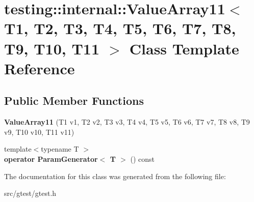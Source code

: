 \hypertarget{classtesting_1_1internal_1_1_value_array11}{}\section{testing\+:\+:internal\+:\+:Value\+Array11$<$ T1, T2, T3, T4, T5, T6, T7, T8, T9, T10, T11 $>$ Class Template Reference}
\label{classtesting_1_1internal_1_1_value_array11}
\subsection*{Public Member Functions}
\begin{DoxyCompactItemize}
\item 
\mbox{\label{classtesting_1_1internal_1_1_value_array11_a2b26f49e7c5856e86f4fae360cd22d47}} 
{\bfseries Value\+Array11} (T1 v1, T2 v2, T3 v3, T4 v4, T5 v5, T6 v6, T7 v7, T8 v8, T9 v9, T10 v10, T11 v11)
\item 
\mbox{\label{classtesting_1_1internal_1_1_value_array11_a3042498fcde8d1c91df474e618416f28}} 
{\footnotesize template$<$typename T $>$ }\\{\bfseries operator Param\+Generator$<$ T $>$} () const
\end{DoxyCompactItemize}


The documentation for this class was generated from the following file\+:\begin{DoxyCompactItemize}
\item 
src/gtest/gtest.\+h\end{DoxyCompactItemize}
